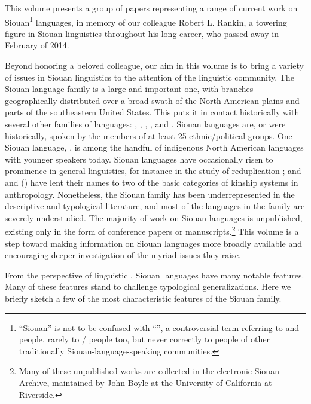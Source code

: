 \begin{refsection}

This volume presents a group of papers representing a range of current work on Siouan\footnote{``Siouan'' is not to be confused with ``'', a controversial term referring to  and  people, rarely to / people too, but never correctly to people of other traditionally Siouan-language-speaking communities.} languages, in memory of our colleague Robert L. Rankin, a towering figure in Siouan linguistics throughout his long career, who passed away in February of 2014.


Beyond honoring a beloved colleague, our aim in this volume is to bring a variety of issues in Siouan linguistics to the attention of the linguistic community. The Siouan language family is a large and important one, with branches geographically distributed over a broad swath of the North American plains and parts of the southeastern United States. This puts it in contact historically with several other families of languages: , , , , and . Siouan languages are, or were historically, spoken by the members of at least 25 ethnic/political groups. One Siouan language, , is among the handful of indigenous North American languages with younger speakers today. Siouan languages have occasionally risen to prominence in general linguistics, for instance in the study of reduplication \citep{Shaw1980}; and  and  () have lent their names to two of the basic categories of kinship systems in anthropology. Nonetheless, the Siouan family has been underrepresented in the descriptive and typological literature, and most of the languages in the family are severely understudied. The majority of work on Siouan languages is unpublished, existing only in the form of conference papers or manuscripts.\footnote{Many of these unpublished works are collected in the electronic Siouan Archive, maintained by John Boyle at the University of California at Riverside.} This volume is a step toward making information on Siouan languages more broadly available and encouraging deeper investigation of the myriad issues they raise.


From the perspective of linguistic , Siouan languages have many notable features. Many of these features stand to challenge typological generalizations. Here we briefly sketch a few of the most characteristic features of the Siouan family.



\end{refsection}
